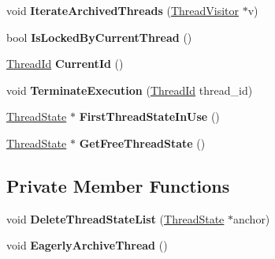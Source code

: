 \begin{DoxyCompactItemize}
\item 
void {\bfseries Iterate\+Archived\+Threads} (\hyperlink{classv8_1_1internal_1_1_thread_visitor}{Thread\+Visitor} $\ast$v)\hypertarget{classv8_1_1internal_1_1_thread_manager_a2fec67e06e5fc2f061ac8f87bb2bb080}{}\label{classv8_1_1internal_1_1_thread_manager_a2fec67e06e5fc2f061ac8f87bb2bb080}

\item 
bool {\bfseries Is\+Locked\+By\+Current\+Thread} ()\hypertarget{classv8_1_1internal_1_1_thread_manager_a76827c7de3e7dcba0f6729ad3657a265}{}\label{classv8_1_1internal_1_1_thread_manager_a76827c7de3e7dcba0f6729ad3657a265}

\item 
\hyperlink{classv8_1_1internal_1_1_thread_id}{Thread\+Id} {\bfseries Current\+Id} ()\hypertarget{classv8_1_1internal_1_1_thread_manager_a20de7ca0770f36132c2f48462ff07e08}{}\label{classv8_1_1internal_1_1_thread_manager_a20de7ca0770f36132c2f48462ff07e08}

\item 
void {\bfseries Terminate\+Execution} (\hyperlink{classv8_1_1internal_1_1_thread_id}{Thread\+Id} thread\+\_\+id)\hypertarget{classv8_1_1internal_1_1_thread_manager_a727811d1054cd52d32130897f5362a13}{}\label{classv8_1_1internal_1_1_thread_manager_a727811d1054cd52d32130897f5362a13}

\item 
\hyperlink{classv8_1_1internal_1_1_thread_state}{Thread\+State} $\ast$ {\bfseries First\+Thread\+State\+In\+Use} ()\hypertarget{classv8_1_1internal_1_1_thread_manager_a31381c48c7f8608f4a2ab582a2c4c729}{}\label{classv8_1_1internal_1_1_thread_manager_a31381c48c7f8608f4a2ab582a2c4c729}

\item 
\hyperlink{classv8_1_1internal_1_1_thread_state}{Thread\+State} $\ast$ {\bfseries Get\+Free\+Thread\+State} ()\hypertarget{classv8_1_1internal_1_1_thread_manager_ae7610d3c55e69ceffd65c6b734813f0b}{}\label{classv8_1_1internal_1_1_thread_manager_ae7610d3c55e69ceffd65c6b734813f0b}

\end{DoxyCompactItemize}
\subsection*{Private Member Functions}
\begin{DoxyCompactItemize}
\item 
void {\bfseries Delete\+Thread\+State\+List} (\hyperlink{classv8_1_1internal_1_1_thread_state}{Thread\+State} $\ast$anchor)\hypertarget{classv8_1_1internal_1_1_thread_manager_a9f65f528b8d918bb62390d469200e5fc}{}\label{classv8_1_1internal_1_1_thread_manager_a9f65f528b8d918bb62390d469200e5fc}

\item 
void {\bfseries Eagerly\+Archive\+Thread} ()\hypertarget{classv8_1_1internal_1_1_thread_manager_ac86e451a498ebd5d66704a4278ef383d}{}\label{classv8_1_1internal_1_1_thread_manager_ac86e451a498ebd5d66704a4278ef383d}

\end{DoxyCompactItemize}

